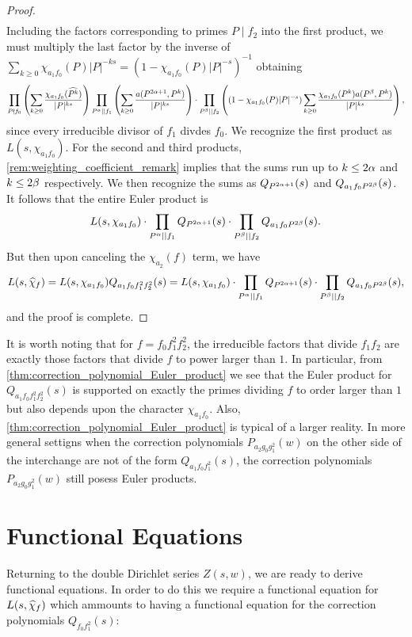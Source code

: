 \documentclass[12pt,reqno,oneside]{amsart}
\begin{document}
\begin{proof}
\begin{align*}
        \end{align*}
        Including the factors corresponding to primes $P \mid f_{2}$ into the first product, we must multiply the last factor by the inverse of $\sum_{k \ge 0}\chi_{a_{1}f_{0}}(P)|P|^{-ks} = (1-\chi_{a_{1}f_{0}}(P)|P|^{-s})^{-1}$ obtaining
        \[
            \prod_{P \nmid f_{0}}\left(\sum_{k \ge 0}\frac{\chi_{a_{1}f_{0}}(\widehat{P^{k}})}{|P|^{ks}}\right)\prod_{P^{\alpha} \mid\mid f_{1}}\left(\sum_{k \ge 0}\frac{a(P^{2\alpha+1},P^{k})}{|P|^{ks}}\right) \cdot \prod_{P^{\beta} \mid\mid f_{2}}\left((1-\chi_{a_{1}f_{0}}(P)|P|^{-s})\sum_{k \ge 0}\frac{\chi_{a_{1}f_{0}}(P^{k})a(P^{\beta},P^{k})}{|P|^{ks}}\right),
        \]
        since every irreducible divisor of $f_{1}$ divdes $f_{0}$. We recognize the first product as $L(s,\chi_{a_{1}f_{0}})$. For the second and third products, \cref{rem:weighting_coefficient_remark} implies that the sums run up to $k \le 2\alpha$ and $k \le 2\beta$ respectively. We then recognize the sums as $Q_{P^{2\alpha+1}}(s)$ and $Q_{a_{1}f_{0}P^{2\beta}}(s)$. It follows that the entire Euler product is
        \[
            L(s,\chi_{a_{1}f_{0}}) \cdot \prod_{P^{\alpha} \mid\mid f_{1}}Q_{P^{2\alpha+1}}(s) \cdot \prod_{P^{\beta} \mid\mid f_{2}}Q_{a_{1}f_{0}P^{2\beta}}(s).
        \]
        But then upon canceling the $\chi_{a_{2}}(f)$ term, we have
        \[
            L(s,\widehat{\chi}_{f}) = L(s,\chi_{a_{1}f_{0}})Q_{a_{1}f_{0}f_{1}^{2}f_{2}^{2}}(s) = L(s,\chi_{a_{1}f_{0}}) \cdot \prod_{P^{\alpha} \mid\mid f_{1}}Q_{P^{2\alpha+1}}(s) \cdot \prod_{P^{\beta} \mid\mid f_{2}}Q_{a_{1}f_{0}P^{2\beta}}(s),
        \]
        and the proof is complete.
    \end{proof}

    It is worth noting that for $f = f_{0}f_{1}^{2}f_{2}^{2}$, the irreducible factors that divide $f_{1}f_{2}$ are exactly those factors that divide $f$ to power larger than $1$. In particular, from \cref{thm:correction_polynomial_Euler_product} we see that the Euler product for $Q_{a_{1}f_{0}f_{1}^{2}f_{2}^{2}}(s)$ is supported on exactly the primes dividing $f$ to order larger than $1$ but also depends upon the character $\chi_{a_{1}f_{0}}$. Also, \cref{thm:correction_polynomial_Euler_product} is typical of a larger reality. In more general settigns when the correction polynomials $P_{a_{2}g_{0}g_{1}^{2}}(w)$ on the other side of the interchange are not of the form $Q_{a_{1}f_{0}f_{1}^{2}}(s)$, the correction polynomials $P_{a_{2}g_{0}g_{1}^{2}}(w)$ still posess Euler products.
\section{Functional Equations}
    Returning to the double Dirichlet series $Z(s,w)$, we are ready to derive functional equations. In order to do this we require a functional equation for $L(s,\widehat{\chi}_{f})$ which ammounts to having a functional equation for the correction polynomials $Q_{f_{0}f_{1}^{2}}(s)$:
\end{document}
